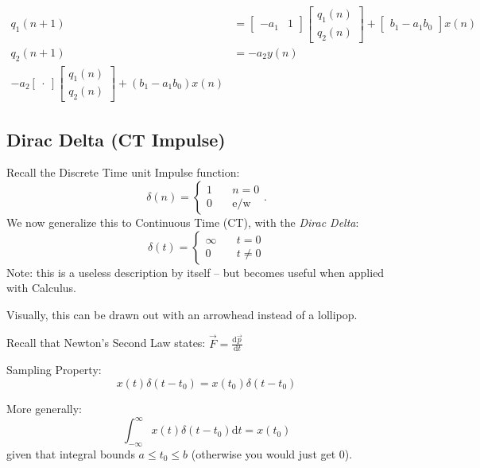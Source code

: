 \begin{align*}
    q_1(n+1) &= \begin{bmatrix}-a_1 & 1\end{bmatrix}
    \begin{bmatrix}
        q_1(n)\\
        q_2(n)
    \end{bmatrix}
    + \begin{bmatrix}
        b_1 - a_1 b_0
    \end{bmatrix} x(n)
    \\
    q_2(n+1) &= -a_2 y(n)  
    \\
    -a_2 \begin{bmatrix}
        .
    \end{bmatrix}
    \begin{bmatrix}
        q_1(n)\\
        q_2(n)
    \end{bmatrix}
    + (
        b_1 - a_1 b_0
    ) x(n)
\end{align*}

\subsection{Dirac Delta (CT Impulse)}
Recall the Discrete Time unit Impulse function:
\[
    \delta(n) = \begin{cases}
        1 & \quad n = 0
        \\
        0 & \quad \text{e/w}
    \end{cases}.
\]
We now generalize this to Continuous Time (CT), with the \textit{Dirac Delta}:
\[
    \delta(t) = \begin{cases}
        \infty & \quad t = 0
        \\
        0 & \quad t\ne0
    \end{cases}
\]
Note: this is a useless description by itself -- but becomes useful when applied with Calculus.

Visually, this can be drawn out with an arrowhead instead of a lollipop.

Recall that Newton's Second Law states: $\vec F = \frac{\mathrm{d}\vec p}{\mathrm{d}t}$


Sampling Property:
\[
    x(t)\delta(t-t_0)
    =
    x(t_0)\delta(t-t_0)
\]

More generally:
\[
    \int_{-\infty}^\infty x(t)\delta(t-t_0) \mathrm d t = x(t_0)
\]
given that integral bounds $a \le t_0 \le b$ (otherwise you would just get 0).

